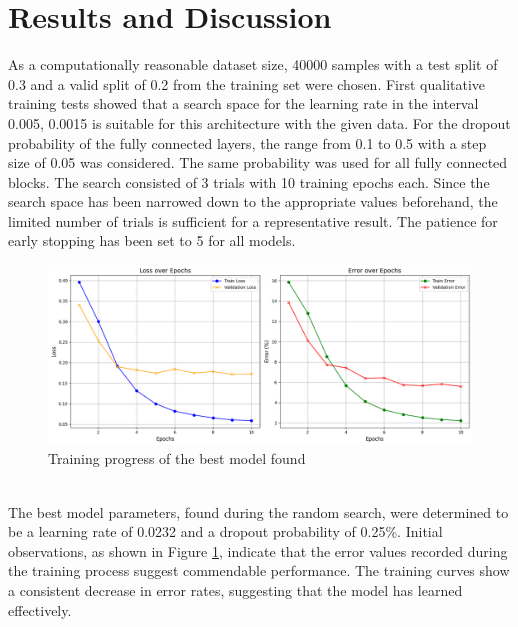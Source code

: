 \documentclass[a4paper, 11pt]{article}
\begin{document}
\section{Results and Discussion}
    As a computationally reasonable dataset size, 40000 samples with a test split of 0.3 and a valid split of 0.2 from the training set were chosen. First qualitative training tests showed that a search space for the learning rate in the interval 0.005, 0.0015 is suitable for this architecture with the given data. For the dropout probability of the fully connected layers, the range from 0.1 to 0.5 with a step size of 0.05 was considered. The same probability was used for all fully connected blocks. The search consisted of 3 trials with 10 training epochs each. Since the search space has been narrowed down to the appropriate values beforehand, the limited number of trials is sufficient for a representative result. The patience for early stopping has been set to 5 for all models. 
    \begin{figure}[h!]
        \includegraphics[width=\linewidth]{imgs/results_lr_0.00232.png}
        \caption{Training progress of the best model found}
        \label{fig:bestModel}
    \end{figure}\\
    The best model parameters, found during the random search, were determined to be a learning rate of 0.0232 and a dropout probability of 0.25\%. Initial observations, as shown in Figure \ref{fig:bestModel}, indicate that the error values recorded during the training process suggest commendable performance. The training curves show a consistent decrease in error rates, suggesting that the model has learned effectively.\\\\
\end{document}
